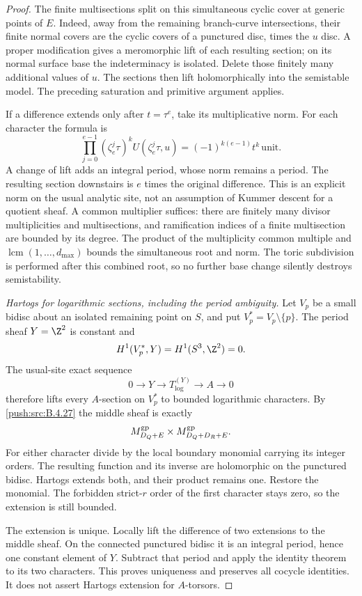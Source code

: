 \begin{proof}
The finite multisections split on this
simultaneous cyclic cover at generic points
of $E$.
Indeed, away from the remaining branch-curve
intersections, their finite normal covers
are the cyclic covers of a punctured disc,
times the $u$ disc. A proper modification
gives a meromorphic lift of each resulting
section; on its normal surface base the
indeterminacy is isolated. Delete those
finitely many additional values of $u$.
The sections then lift holomorphically into
the semistable model. The preceding
saturation and primitive argument applies.

If a difference extends only after
$t=\tau^e$, take its multiplicative norm.
For each character the formula is
\[
 \prod_{j=0}^{e-1}(\zeta_e^j\tau)^k
                      U(\zeta_e^j\tau,u)
   =(-1)^{k(e-1)}t^k\,\text{unit}.
 \tag{B.4.30.10}
\]
A change of lift adds an integral period,
whose norm remains a period. The resulting
section downstairs is $e$ times the original
difference. This is an explicit norm on the
usual analytic site, not an assumption of
Kummer descent for a quotient sheaf. A
common multiplier suffices: there are
finitely many divisor multiplicities and
multisections, and ramification indices of
a finite multisection are bounded by its
degree. The product of the multiplicity
common multiple and
$\operatorname{lcm}(1,\ldots,d_{\max})$
bounds the simultaneous root and norm.
The toric subdivision is performed after
this combined root, so no further base
change silently destroys semistability.

\emph{Hartogs for logarithmic sections, including the period ambiguity.}
Let $V_p$ be a small bidisc about an isolated
remaining point on $S$, and put
$V_p^*=V_p\setminus\{p\}$. The period sheaf
$Y=\Z^2$ is constant and
\[
 H^1(V_p^*,Y)=H^1(S^3,\Z^2)=0.
\]
The usual-site exact sequence
\[
 0\longrightarrow Y\longrightarrow
 T_{\log}^{(Y)}\longrightarrow A\longrightarrow0
 \tag{B.4.30.11}
\]
therefore lifts every $A$-section on $V_p^*$
to bounded logarithmic characters. By
\ref{push:src:B.4.27} the middle sheaf is exactly
\[
 M_{D_Q+E}^{\rm gp}\times
 M_{D_Q+D_R+E}^{\rm gp}.
\]
For either character divide by the local
boundary monomial carrying its integer
orders. The resulting function and its
inverse are holomorphic on the punctured
bidisc. Hartogs extends both, and their
product remains one. Restore the monomial.
The forbidden strict-$r$ order of the first
character stays zero, so the extension is
still bounded.

The extension is unique. Locally lift the
difference of two extensions to the middle
sheaf. On the connected punctured bidisc
it is an integral period, hence one constant
element of $Y$. Subtract that period and
apply the identity theorem to its two
characters. This proves uniqueness and
preserves all cocycle identities. It does
not assert Hartogs extension for $A$-torsors.


\end{proof}
